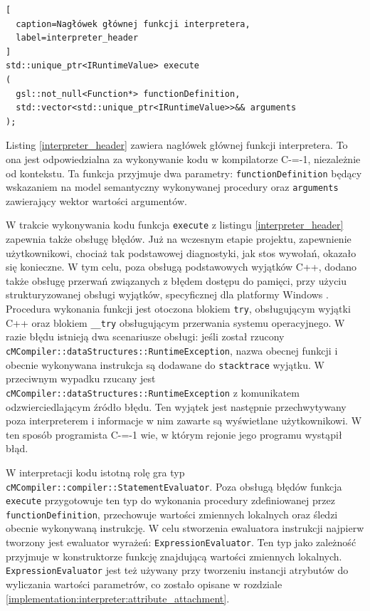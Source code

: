 \begin{lstlisting}[
  caption=Nagłówek głównej funkcji interpretera,
  label=interpreter_header
]
std::unique_ptr<IRuntimeValue> execute
(
  gsl::not_null<Function*> functionDefinition,
  std::vector<std::unique_ptr<IRuntimeValue>>&& arguments
);
\end{lstlisting}

Listing \ref{interpreter_header} zawiera nagłówek głównej funkcji interpretera.
To ona jest odpowiedzialna za wykonywanie kodu w kompilatorze C-=-1, niezależnie od kontekstu.
Ta funkcja przyjmuje dwa parametry: \lstinline{functionDefinition} będący wskazaniem na model semantyczny wykonywanej procedury oraz \lstinline{arguments} zawierający wektor wartości argumentów.

W trakcie wykonywania kodu funkcja \lstinline{execute} z listingu \ref{interpreter_header} zapewnia także obsługę błędów.
Już na wczesnym etapie projektu, zapewnienie użytkownikowi, chociaż tak podstawowej diagnostyki, jak stos wywołań, okazało się konieczne.
W tym celu, poza obsługą podstawowych wyjątków C++, dodano także obsługę przerwań związanych z błędem dostępu do pamięci, przy użyciu strukturyzowanej obsługi wyjątków, specyficznej dla platformy Windows \cite{structured_exception_handling, structured_exception_handling:microsoft}.
Procedura wykonania funkcji jest otoczona blokiem \lstinline{try}, obsługującym wyjątki C++ oraz blokiem \lstinline{__try} obsługującym przerwania systemu operacyjnego.
W razie błędu istnieją dwa scenariusze obsługi: jeśli został rzucony \\\lstinline{cMCompiler::dataStructures::RuntimeException}, nazwa obecnej funkcji i obecnie wykonywana instrukcja są dodawane do \lstinline{stacktrace} wyjątku.
W przeciwnym wypadku rzucany jest \\\lstinline{cMCompiler::dataStructures::RuntimeException} z komunikatem odzwierciedlającym źródło błędu.
Ten wyjątek jest następnie przechwytywany poza interpreterem i informacje w nim zawarte są wyświetlane użytkownikowi.
W ten sposób programista C-=-1 wie, w którym rejonie jego programu wystąpił błąd.

W interpretacji kodu istotną rolę gra typ \lstinline{cMCompiler::compiler::StatementEvaluator}.
Poza obsługą błędów funkcja \lstinline{execute} przygotowuje ten typ do wykonania procedury zdefiniowanej przez \lstinline{functionDefinition}, przechowuje wartości zmiennych lokalnych oraz śledzi obecnie wykonywaną instrukcję.
W celu stworzenia ewaluatora instrukcji najpierw tworzony jest ewaluator wyrażeń: \lstinline{ExpressionEvaluator}.
Ten typ jako zależność przyjmuje w konstruktorze funkcję znajdującą wartości zmiennych lokalnych.
\lstinline{ExpressionEvaluator} jest też używany przy tworzeniu instancji atrybutów do wyliczania wartości parametrów, co zostało opisane w rozdziale \ref{implementation:interpreter:attribute_attachment}.

